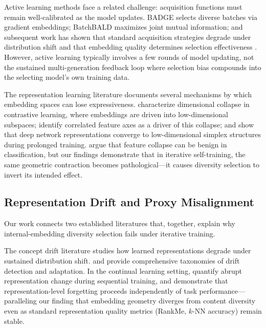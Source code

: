 Active learning methods face a related challenge: acquisition functions must remain well-calibrated as the model updates. BADGE \citep{ash2020deep} selects diverse batches via gradient embeddings; BatchBALD \citep{kirsch2019batchbald} maximizes joint mutual information; and subsequent work has shown that standard acquisition strategies degrade under distribution shift \citep{kothawade2021similar} and that embedding quality determines selection effectiveness \citep{yehuda2022active}. However, active learning typically involves a few rounds of model updating, not the sustained multi-generation feedback loop where selection bias compounds into the selecting model's own training data.

The representation learning literature documents several mechanisms by which embedding spaces can lose expressiveness. \citet{jing2022understanding} characterize dimensional collapse in contrastive learning, where embeddings are driven into low-dimensional subspaces; \citet{hua2021feature} identify correlated feature axes as a driver of this collapse; and \citet{papyan2020prevalence} show that deep network representations converge to low-dimensional simplex structures during prolonged training. \citet{laurent2024feature} argue that feature collapse can be benign in classification, but our findings demonstrate that in iterative self-training, the same geometric contraction becomes pathological---it causes diversity selection to invert its intended effect.

\subsection{Representation Drift and Proxy Misalignment}

Our work connects two established literatures that, together, explain why internal-embedding diversity selection fails under iterative training.

The concept drift literature studies how learned representations degrade under sustained distribution shift. \citet{lu2019learning} and \citet{gama2014survey} provide comprehensive taxonomies of drift detection and adaptation. In the continual learning setting, \citet{caccia2022new} quantify abrupt representation change during sequential training, and \citet{davari2022probing} demonstrate that representation-level forgetting proceeds independently of task performance---paralleling our finding that embedding geometry diverges from content diversity even as standard representation quality metrics (RankMe, $k$-NN accuracy) remain stable.

